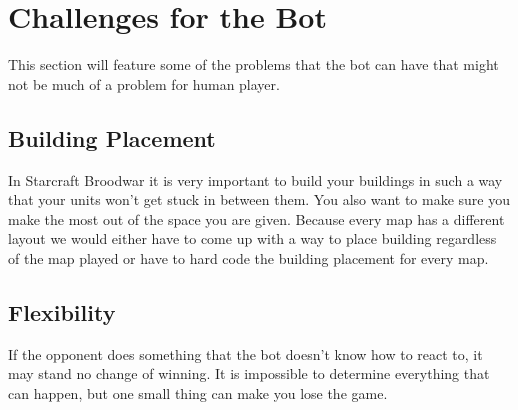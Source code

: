 \section{Challenges for the Bot}
	This section will feature some of the problems that the bot can have that might not be much of a problem for human player.
	\subsection*{Building Placement}
		In Starcraft Broodwar it is very important to build your buildings in such a 
		way that your units won't get stuck in between them. You also want to make sure you make the most out of the space you are given. 
		Because every map has
		a different layout we would either have to come up with a way to place building regardless of the map played or have to hard code the building 
		placement for every map.
	
	\subsection*{Flexibility}
		If the opponent does something that the bot doesn't know how to react to, it may stand no change of winning. 
		It is impossible to determine everything that can happen, but one small thing can make you lose the game. 